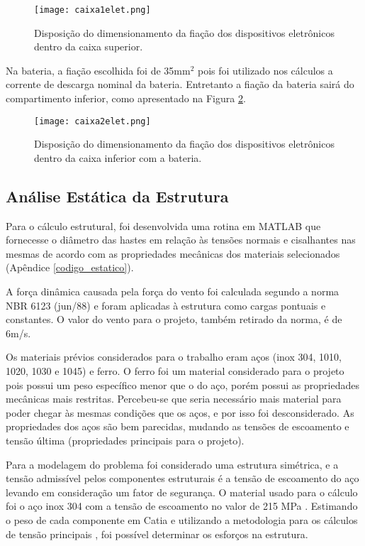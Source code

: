 \begin{figure}[h]
	\centering
    \texttt{[image: caixa1elet.png]}
    \caption{Disposição do dimensionamento da fiação dos dispositivos eletrônicos dentro da caixa superior.}
    \label{caixa1elet}
\end{figure}


 Na bateria, a fiação escolhida foi de 35mm$^2$ pois foi utilizado nos cálculos a corrente de descarga nominal da bateria. Entretanto a fiação da bateria sairá do compartimento inferior, como apresentado na Figura \ref{caixa2elet}.

\begin{figure}[h]
	\centering
    \texttt{[image: caixa2elet.png]}
    \caption{Disposição do dimensionamento da fiação dos dispositivos eletrônicos dentro da caixa inferior com a bateria.}
    \label{caixa2elet}
\end{figure}



\subsection{Análise Estática da Estrutura}

Para o cálculo estrutural, foi desenvolvida uma rotina em MATLAB que fornecesse o diâmetro das hastes em relação às tensões normais e cisalhantes nas mesmas de acordo com as propriedades mecânicas dos materiais selecionados (Apêndice \ref{codigo_estatico}).


A força dinâmica causada pela força do vento foi calculada segundo a norma NBR 6123 (jun/88) \cite{vento} e foram aplicadas à estrutura como cargas pontuais e constantes. O valor do vento para o projeto, também retirado da norma, é de 6m/s.

Os materiais prévios considerados para o trabalho eram aços (inox 304, 1010, 1020, 1030 e 1045) e ferro. O ferro foi um material considerado para o projeto pois possui um peso específico menor que o do aço, porém possui as propriedades mecânicas mais restritas. Percebeu-se que seria necessário mais material para poder chegar às mesmas condições que os aços, e por isso foi desconsiderado. As propriedades dos aços são bem parecidas, mudando as tensões de escoamento e tensão última (propriedades principais para o projeto).

Para a modelagem do problema foi considerado uma estrutura simétrica, e a tensão admissível pelos componentes estruturais é a tensão de escoamento do aço levando em consideração um fator de segurança. O material usado para o cálculo foi o aço inox 304 com a tensão de escoamento no valor de 215 MPa \cite{callister}. Estimando o peso de cada componente em Catia e utilizando a metodologia para os cálculos de tensão principais \cite{beer}, foi possível determinar os esforços na estrutura.

